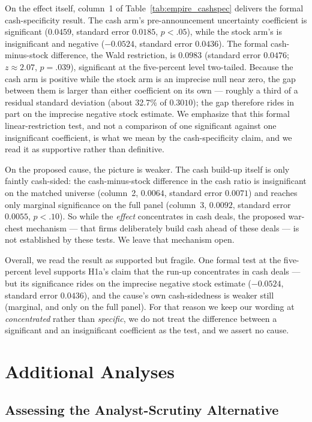 On the effect itself, column~1 of Table~\ref{tab:empire_cashspec} delivers the formal cash-specificity result. The cash arm's pre-announcement uncertainty coefficient is significant ($0.0459$, standard error $0.0185$, $p<.05$), while the stock arm's is insignificant and negative ($-0.0524$, standard error $0.0436$). The formal cash-minus-stock difference, the Wald restriction, is $0.0983$ (standard error $0.0476$; $z\approx2.07$, $p=.039$), significant at the five-percent level two-tailed. Because the cash arm is positive while the stock arm is an imprecise null near zero, the gap between them is larger than either coefficient on its own --- roughly a third of a residual standard deviation (about 32.7\% of $0.3010$); the gap therefore rides in part on the imprecise negative stock estimate. We emphasize that this formal linear-restriction test, and not a comparison of one significant against one insignificant coefficient, is what we mean by the cash-specificity claim, and we read it as supportive rather than definitive.

On the proposed cause, the picture is weaker. The cash build-up itself is only faintly cash-sided: the cash-minus-stock difference in the cash ratio is insignificant on the matched universe (column~2, $0.0064$, standard error $0.0071$) and reaches only marginal significance on the full panel (column~3, $0.0092$, standard error $0.0055$, $p<.10$). So while the \emph{effect} concentrates in cash deals, the proposed war-chest mechanism --- that firms deliberately build cash ahead of these deals --- is not established by these tests. We leave that mechanism open.

Overall, we read the result as supported but fragile. One formal test at the five-percent level supports H1a's claim that the run-up concentrates in cash deals --- but its significance rides on the imprecise negative stock estimate ($-0.0524$, standard error $0.0436$), and the cause's own cash-sidedness is weaker still (marginal, and only on the full panel). For that reason we keep our wording at \emph{concentrated} rather than \emph{specific}, we do not treat the difference between a significant and an insignificant coefficient as the test, and we assert no cause.

\chapter{Additional Analyses}\label{ch:additional}

\section{Assessing the Analyst-Scrutiny Alternative}

